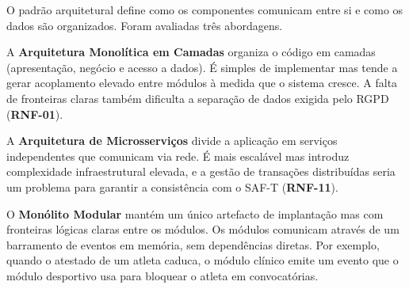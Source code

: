 O padrão arquitetural define como os componentes comunicam entre si e como os dados são organizados. Foram avaliadas três abordagens.

A \textbf{Arquitetura Monolítica em Camadas} organiza o código em camadas (apresentação, negócio e acesso a dados). É simples de implementar mas tende a gerar acoplamento elevado entre módulos à medida que o sistema cresce. A falta de fronteiras claras também dificulta a separação de dados exigida pelo RGPD (\textbf{RNF-01}).

A \textbf{Arquitetura de Microsserviços} divide a aplicação em serviços independentes que comunicam via rede. É mais escalável mas introduz complexidade infraestrutural elevada, e a gestão de transações distribuídas seria um problema para garantir a consistência com o SAF-T \cite{saft2024} (\textbf{RNF-11}).

O \textbf{Monólito Modular} mantém um único artefacto de implantação mas com fronteiras lógicas claras entre os módulos. Os módulos comunicam através de um barramento de eventos em memória, sem dependências diretas. Por exemplo, quando o atestado de um atleta caduca, o módulo clínico emite um evento que o módulo desportivo usa para bloquear o atleta em convocatórias.


